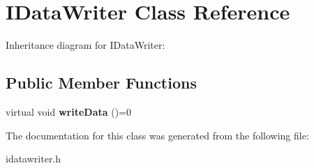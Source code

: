 \hypertarget{classIDataWriter}{}\section{I\+Data\+Writer Class Reference}
\label{classIDataWriter}


Inheritance diagram for I\+Data\+Writer\+:
\subsection*{Public Member Functions}
\begin{DoxyCompactItemize}
\item 
\mbox{\label{classIDataWriter_a8f6141f1c1e2c2c214a3b219293d6858}} 
virtual void {\bfseries write\+Data} ()=0
\end{DoxyCompactItemize}


The documentation for this class was generated from the following file\+:\begin{DoxyCompactItemize}
\item 
idatawriter.\+h\end{DoxyCompactItemize}
